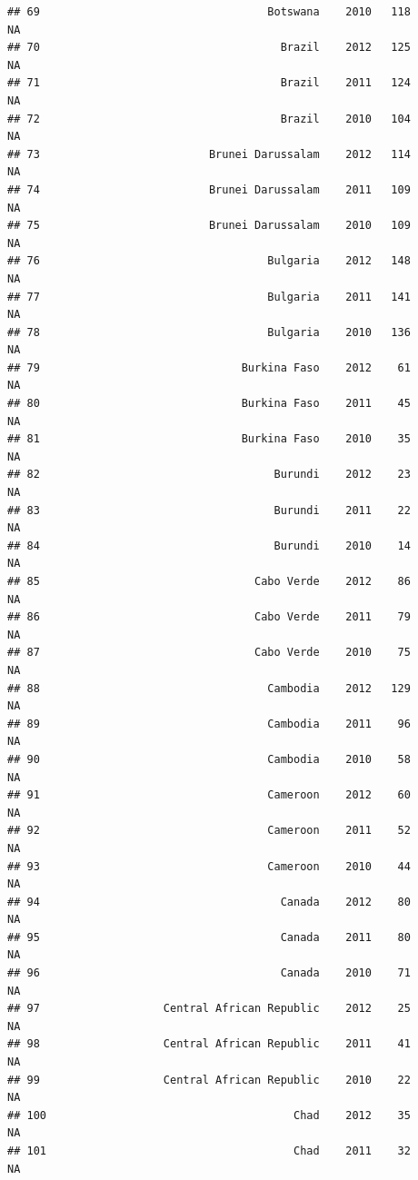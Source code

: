 \documentclass[
]{book}
\begin{document}
\begin{verbatim}
## 69                                   Botswana    2010   118              NA
## 70                                     Brazil    2012   125              NA
## 71                                     Brazil    2011   124              NA
## 72                                     Brazil    2010   104              NA
## 73                          Brunei Darussalam    2012   114              NA
## 74                          Brunei Darussalam    2011   109              NA
## 75                          Brunei Darussalam    2010   109              NA
## 76                                   Bulgaria    2012   148              NA
## 77                                   Bulgaria    2011   141              NA
## 78                                   Bulgaria    2010   136              NA
## 79                               Burkina Faso    2012    61              NA
## 80                               Burkina Faso    2011    45              NA
## 81                               Burkina Faso    2010    35              NA
## 82                                    Burundi    2012    23              NA
## 83                                    Burundi    2011    22              NA
## 84                                    Burundi    2010    14              NA
## 85                                 Cabo Verde    2012    86              NA
## 86                                 Cabo Verde    2011    79              NA
## 87                                 Cabo Verde    2010    75              NA
## 88                                   Cambodia    2012   129              NA
## 89                                   Cambodia    2011    96              NA
## 90                                   Cambodia    2010    58              NA
## 91                                   Cameroon    2012    60              NA
## 92                                   Cameroon    2011    52              NA
## 93                                   Cameroon    2010    44              NA
## 94                                     Canada    2012    80              NA
## 95                                     Canada    2011    80              NA
## 96                                     Canada    2010    71              NA
## 97                   Central African Republic    2012    25              NA
## 98                   Central African Republic    2011    41              NA
## 99                   Central African Republic    2010    22              NA
## 100                                      Chad    2012    35              NA
## 101                                      Chad    2011    32              NA

\end{verbatim}
\end{document}
